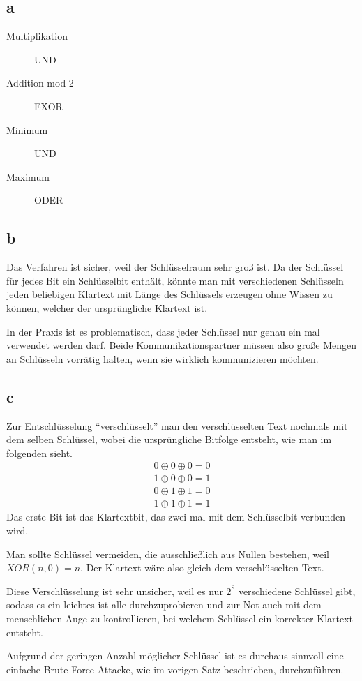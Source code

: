 \documentclass[a4paper,10pt]{article}
\begin{document}
\subsection*{a}

\begin{description}
 \item[Multiplikation] UND
 \item[Addition mod 2] EXOR
 \item[Minimum] UND
 \item[Maximum] ODER
\end{description}

\subsection*{b}

Das Verfahren ist sicher, weil der Schlüsselraum sehr groß ist.
Da der Schlüssel für jedes Bit ein Schlüsselbit enthält, könnte man mit verschiedenen Schlüsseln jeden beliebigen Klartext mit Länge des Schlüssels erzeugen ohne Wissen zu können, welcher der ursprüngliche Klartext ist.

In der Praxis ist es problematisch, dass jeder Schlüssel nur genau ein mal verwendet werden darf.
Beide Kommunikationspartner müssen also große Mengen an Schlüsseln vorrätig halten, wenn sie wirklich kommunizieren möchten.

\subsection*{c}

Zur Entschlüsselung ``verschlüsselt'' man den verschlüsselten Text nochmals mit dem selben Schlüssel, wobei die ursprüngliche Bitfolge entsteht, wie man im folgenden sieht.
\begin{align*}
 0 \oplus 0 \oplus 0 = 0\\
 1 \oplus 0 \oplus 0 = 1\\
 0 \oplus 1 \oplus 1 = 0\\
 1 \oplus 1 \oplus 1 = 1
\end{align*}
Das erste Bit ist das Klartextbit, das zwei mal mit dem Schlüsselbit verbunden wird.

Man sollte Schlüssel vermeiden, die ausschließlich aus Nullen bestehen, weil $XOR(n, 0) = n$.
Der Klartext wäre also gleich dem verschlüsselten Text.

Diese Verschlüsselung ist sehr unsicher, weil es nur $2^8$ verschiedene Schlüssel gibt, sodass es ein leichtes ist alle durchzuprobieren und zur Not auch mit dem menschlichen Auge zu kontrollieren, bei welchem Schlüssel ein korrekter Klartext entsteht.

Aufgrund der geringen Anzahl möglicher Schlüssel ist es durchaus sinnvoll eine einfache Brute-Force-Attacke, wie im vorigen Satz beschrieben, durchzuführen.
\end{document}
